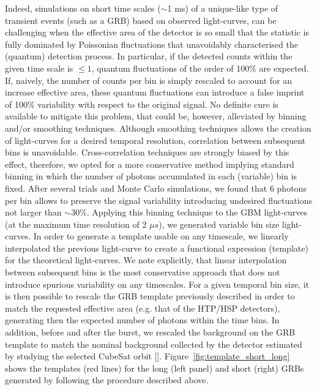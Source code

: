 \documentclass[]{spie}  %
\def \us{$\mu s$\xspace}
\begin{document}
Indeed, simulations on short time scales ($\sim$1 ms) of a unique-like type of transient events (such as a GRB) based on observed light-curves, can be challenging when the effective area of the detector is so small that the statistic is fully dominated by Poissonian fluctuations that unavoidably characterised the (quantum) detection process. In particular, if the detected counts within the given time scale is $\leq1$, quantum fluctuations of the order of 100\% are expected. If, naively, the number of counts per bin is simply rescaled to account for an increase effective area, these quantum fluctuations can introduce a false imprint of 100\% variability with respect to the original signal. No definite cure is available to mitigate this problem, that could be, however, alleviated by binning and/or smoothing techniques. Although smoothing techniques allows the creation of light-curves for a desired temporal resolution, correlation between subsequent bins is unavoidable. Cross-correlation techniques are strongly biased by this effect, therefore, we opted for a more conservative method implying standard binning in which the number of photons accumulated in each (variable) bin is fixed. After several trials and Monte Carlo simulations, we found that 6 photons per bin allows to preserve the signal variability introducing undesired fluctuations not larger than $\sim$30\%. Applying this binning technique to the GBM light-curves (at the maximum time resolution of 2 \us), we generated variable bin size light-curves. In order to generate a template usable on any timescale, we linearly interpolated the previous light-curve to create a functional expression (template) for the theoretical light-curves. We note explicitly, that linear interpolation between subsequent bins is the most conservative approach that does not introduce spurious variability on any timescales. For a given temporal bin size, it is then possible to rescale the GRB template previously described in order to match the requested effective area (e.g. that of the HTP/HSP detectors), generating then the expected number of photons within the time bins. In addition, before and after the burst, we rescaled the background on the GRB template to match the nominal background collected by the detector estimated by studying the selected CubeSat orbit []. Figure~\ref{fig:template_short_long} shows the templates (red lines) for the long (left panel) and short (right) GRBs generated by following the procedure described above. 
\end{document}
